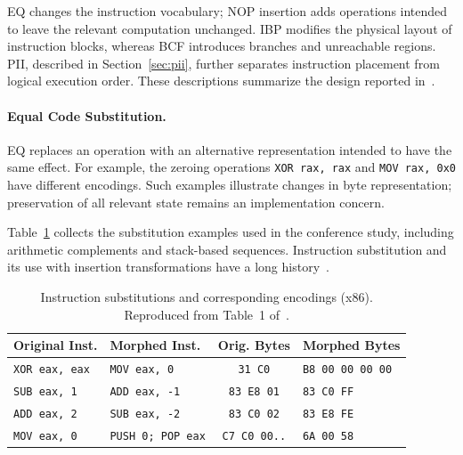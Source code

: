 \documentclass[runningheads]{llncs}
\begin{document}
EQ changes the instruction vocabulary; NOP insertion adds operations intended to leave the relevant computation unchanged. IBP modifies the physical layout of instruction blocks, whereas BCF introduces branches and unreachable regions. PII, described in Section~\ref{sec:pii}, further separates instruction placement from logical execution order. These descriptions summarize the design reported in~\cite{zone_secrypt_2026}.

\paragraph{Equal Code Substitution.}
EQ replaces an operation with an alternative representation intended to have the same effect. For example, the zeroing operations \texttt{XOR rax, rax} and \texttt{MOV rax, 0x0} have different encodings. Such examples illustrate changes in byte representation; preservation of all relevant state remains an implementation concern.

Table~\ref{tab:instruction_substitutions_x86} collects the substitution examples used in the conference study, including arithmetic complements and stack-based sequences. Instruction substitution and its use with insertion transformations have a long history~\cite{desai2008towards,desai2010highly,szor2001hunting}.

\begin{table}[t]
    \caption{Instruction substitutions and corresponding encodings (x86). Reproduced from Table~1 of~\cite{zone_secrypt_2026}.}
    \label{tab:instruction_substitutions_x86}
    \small
    \centering
    \setlength{\tabcolsep}{3pt}
    \begin{tabular}{llcl}
        \hline
        \textbf{Original Inst.} & \textbf{Morphed Inst.} & \textbf{Orig. Bytes} & \textbf{Morphed Bytes} \\ \hline
        \texttt{XOR eax, eax} & \texttt{MOV eax, 0} & \texttt{31 C0} & \texttt{B8 00 00 00 00} \\
        \texttt{SUB eax, 1} & \texttt{ADD eax, -1} & \texttt{83 E8 01} & \texttt{83 C0 FF} \\
        \texttt{ADD eax, 2} & \texttt{SUB eax, -2} & \texttt{83 C0 02} & \texttt{83 E8 FE} \\
        \texttt{MOV eax, 0} & \texttt{PUSH 0; POP eax} & \texttt{C7 C0 00..} & \texttt{6A 00 58} \\ \hline
    \end{tabular}
\end{table}
\end{document}
